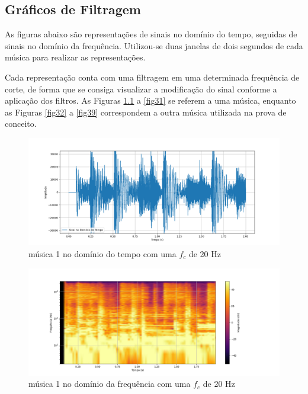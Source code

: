 \begin{anexosenv}

\partanexos

\chapter{Gráficos de Filtragem}

As figuras abaixo são representações de sinais no domínio do tempo, seguidas de sinais no domínio da frequência. Utilizou-se duas janelas de dois segundos de cada música para realizar as representações. 

Cada representação conta com uma filtragem em uma determinada frequência de corte, de forma que se consiga visualizar a modificação do sinal conforme a aplicação dos filtros. As Figuras \ref{fig24} a \ref{fig31} se referem a uma música, enquanto as Figuras \ref{fig32} a \ref{fig39} correspondem a outra música utilizada na prova de conceito.
 
\begin{figure}[h]
	\centering
    \includegraphics[width=\textwidth]{figuras/fig24.png}
	\caption{música 1 no domínio do tempo com uma $f_c$ de 20 Hz}
	\label{fig24}
\end{figure}

\begin{figure}[h]
	\centering
    \includegraphics[width=\textwidth]{figuras/fig25.png}
	\caption{música 1 no domínio da frequência com uma $f_c$ de 20 Hz}
	\label{fig25}
\end{figure}


\end{anexosenv}
